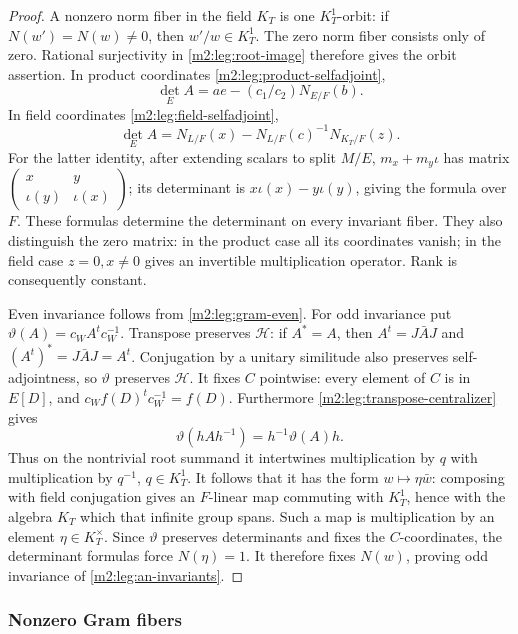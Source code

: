 \begin{proof}
A nonzero norm fiber in the field $K_T$ is one $K_T^1$-orbit:
if $N(w')=N(w)\ne0$, then $w'/w\in K_T^1$.
The zero norm fiber consists only of zero. Rational surjectivity in
\cref{m2:leg:root-image} therefore gives the orbit assertion.
In product coordinates \eqref{m2:leg:product-selfadjoint},
\[
 \det_E A=ae-(c_1/c_2)N_{E/F}(b).
\]
In field coordinates \eqref{m2:leg:field-selfadjoint},
\begin{equation}\label{m2:leg:field-determinant}
 \det_E A=N_{L/F}(x)-N_{L/F}(c)^{-1}N_{K_T/F}(z).
\end{equation}
For the latter identity, after extending scalars to split $M/E$,
$m_x+m_y\iota$ has matrix
$\left(\begin{smallmatrix}x&y\\\iota(y)&\iota(x)\end{smallmatrix}\right)$;
its determinant is $x\iota(x)-y\iota(y)$, giving the formula over $F$.
These formulas determine the determinant on every invariant fiber.
They also distinguish the zero matrix: in the product case all its
coordinates vanish; in the field case $z=0,x\ne0$ gives an invertible
multiplication operator. Rank is consequently constant.

Even invariance follows from \eqref{m2:leg:gram-even}.
For odd invariance put $\vartheta(A)=c_WA^tc_W^{-1}$.
Transpose preserves $\mathcal H$: if $A^*=A$, then
$A^t=J\bar AJ$ and $(A^t)^*=J\bar AJ=A^t$.
Conjugation by a unitary similitude also preserves self-adjointness,
so $\vartheta$ preserves $\mathcal H$.
It fixes $C$ pointwise: every element of $C$ is in $E[D]$, and
$c_Wf(D)^tc_W^{-1}=f(D)$.
Furthermore \eqref{m2:leg:transpose-centralizer} gives
\[
 \vartheta(hAh^{-1})=h^{-1}\vartheta(A)h.
\]
Thus on the nontrivial root summand it intertwines multiplication
by $q$ with multiplication by $q^{-1}$, $q\in K_T^1$.
It follows that it has the form $w\mapsto\eta\bar w$:
composing with field conjugation gives an $F$-linear map commuting
with $K_T^1$, hence with the algebra $K_T$ which that infinite group
spans. Such a map is multiplication by an element $\eta\in K_T^\times$.
Since $\vartheta$ preserves determinants and fixes the $C$-coordinates,
the determinant formulas force $N(\eta)=1$.
It therefore fixes $N(w)$, proving odd invariance of \eqref{m2:leg:an-invariants}.
\end{proof}

\subsubsection{Nonzero Gram fibers}

